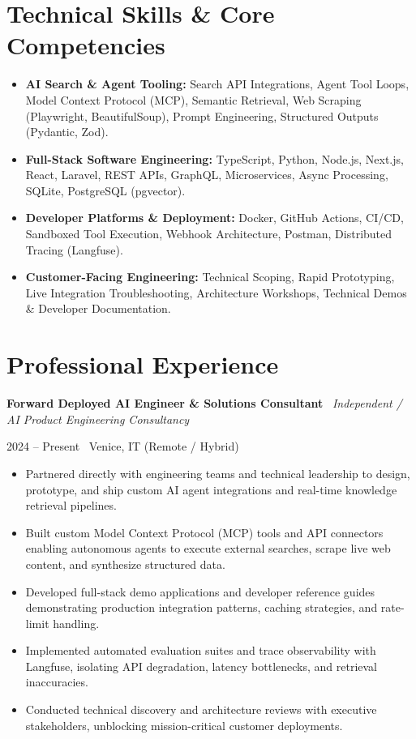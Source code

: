 \documentclass[a4paper,10pt]{article}
\newcommand{\role}[4]{%
  \vspace{2pt}\noindent
  \begin{minipage}[t]{0.70\textwidth}\raggedright\textbf{#1} \textbullet\ \textit{#3}\end{minipage}%
  \hfill
  \begin{minipage}[t]{0.28\textwidth}\raggedleft\footnotesize\color{gray}#2 \textbullet\ #4\end{minipage}%
  \vspace{1pt}%
}
\begin{document}
\section{Technical Skills \& Core Competencies}
\begin{itemize}[leftmargin=1.2em, itemsep=2pt]
  \item \textbf{AI Search \& Agent Tooling:} Search API Integrations, Agent Tool Loops, Model Context Protocol (MCP), Semantic Retrieval, Web Scraping (Playwright, BeautifulSoup), Prompt Engineering, Structured Outputs (Pydantic, Zod).
  \item \textbf{Full-Stack Software Engineering:} TypeScript, Python, Node.js, Next.js, React, Laravel, REST APIs, GraphQL, Microservices, Async Processing, SQLite, PostgreSQL (pgvector).
  \item \textbf{Developer Platforms \& Deployment:} Docker, GitHub Actions, CI/CD, Sandboxed Tool Execution, Webhook Architecture, Postman, Distributed Tracing (Langfuse).
  \item \textbf{Customer-Facing Engineering:} Technical Scoping, Rapid Prototyping, Live Integration Troubleshooting, Architecture Workshops, Technical Demos \& Developer Documentation.
\end{itemize}

\section{Professional Experience}

\role{Forward Deployed AI Engineer \& Solutions Consultant}{2024 -- Present}{Independent / AI Product Engineering Consultancy}{Venice, IT (Remote / Hybrid)}
\begin{itemize}
  \item Partnered directly with engineering teams and technical leadership to design, prototype, and ship custom AI agent integrations and real-time knowledge retrieval pipelines.
  \item Built custom Model Context Protocol (MCP) tools and API connectors enabling autonomous agents to execute external searches, scrape live web content, and synthesize structured data.
  \item Developed full-stack demo applications and developer reference guides demonstrating production integration patterns, caching strategies, and rate-limit handling.
  \item Implemented automated evaluation suites and trace observability with Langfuse, isolating API degradation, latency bottlenecks, and retrieval inaccuracies.
  \item Conducted technical discovery and architecture reviews with executive stakeholders, unblocking mission-critical customer deployments.
\end{itemize}
\end{document}
